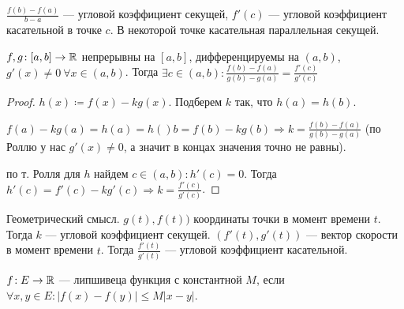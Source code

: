 \begin{remark}
    $\frac{f(b) - f(a)}{b - a}$ --- угловой коэффициент секущей, $f'(c)$ --- угловой коэффициент касательной в точке  $c$. В некоторой точке касательная параллельная секущей. 
\end{remark}
\begin{theorem}
    $f, g\!:[a, b] \to \mathbb{R}$ непрерывны на  $[a, b]$, дифференцируемы на  $(a, b)$,  $g'(x) \neq 0\ \forall x\in(a, b)$. Тогда $\exists c \in (a, b)\!: \frac{f(b) - f(a)}{g(b) - g(a)} = \frac{f'(c)}{g'(c)}$
\end{theorem}
\begin{proof}
    $h(x) \coloneqq f(x) - kg(x)$. Подберем $k$ так, что  $h(a) = h(b)$.

    $f(a) - kg(a) = h(a) = h()b = f(b) - kg(b) \Rightarrow k = \frac{f(b) - f(a)}{g(b) - g(a)}$ (по Роллю у нас $g'(x) \neq 0$, а значит в концах значения точно не равны).

    по т. Ролля для $h$ найдем  $c \in (a, b)\!: h'(c) = 0$. Тогда  $h'(c) = f'(c) - kg'(c) \Rightarrow k = \frac{f'(c)}{g'(c)}$.
\end{proof}
\begin{remark}
    Геометрический смысл. $g(t), f(t))$ координаты точки в момент времени  $t$. Тогда  $k$ --- угловой коэффициент секущей. $(f'(t), g'(t))$ --- вектор скорости в момент времени  $t$. Тогда $\frac{f'(t)}{g'(t)}$ --- угловой коэффициент касательной. 
\end{remark}
\begin{definition}
    $f\!:E\to \mathbb{R}$ --- липшивеца функция с константной $M$, если  $\forall x, y \in E\!: |f(x) - f(y)| \le M|x-y|$.
\end{definition}
